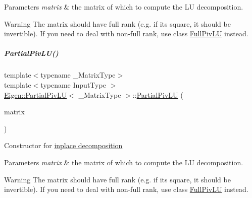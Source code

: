 \begin{DoxyParams}{Parameters}
{\em matrix} & the matrix of which to compute the LU decomposition.\\
\hline
\end{DoxyParams}
\begin{DoxyWarning}{Warning}
The matrix should have full rank (e.\+g. if it\textquotesingle{}s square, it should be invertible). If you need to deal with non-\/full rank, use class \hyperlink{group___l_u___module_class_eigen_1_1_full_piv_l_u}{Full\+Piv\+LU} instead. 
\end{DoxyWarning}
\mbox{\label{group___l_u___module_a8496e71c5cc03948c06aff2fa9e21e40}} 
\subparagraph{\texorpdfstring{Partial\+Piv\+L\+U()}{PartialPivLU()}\hspace{0.1cm}{\footnotesize\ttfamily [8/8]}}
{\footnotesize\ttfamily template$<$typename \+\_\+\+Matrix\+Type$>$ \\
template$<$typename Input\+Type $>$ \\
\hyperlink{group___l_u___module_class_eigen_1_1_partial_piv_l_u}{Eigen\+::\+Partial\+Piv\+LU}$<$ \+\_\+\+Matrix\+Type $>$\+::\hyperlink{group___l_u___module_class_eigen_1_1_partial_piv_l_u}{Partial\+Piv\+LU} (\begin{DoxyParamCaption}\item[{\hyperlink{group___core___module_struct_eigen_1_1_eigen_base}{Eigen\+Base}$<$ Input\+Type $>$ \&}]{matrix }\end{DoxyParamCaption})\hspace{0.3cm}{\ttfamily [explicit]}}

Constructor for \hyperlink{group___inplace_decomposition}{inplace decomposition }


\begin{DoxyParams}{Parameters}
{\em matrix} & the matrix of which to compute the LU decomposition.\\
\hline
\end{DoxyParams}
\begin{DoxyWarning}{Warning}
The matrix should have full rank (e.\+g. if it\textquotesingle{}s square, it should be invertible). If you need to deal with non-\/full rank, use class \hyperlink{group___l_u___module_class_eigen_1_1_full_piv_l_u}{Full\+Piv\+LU} instead. 
\end{DoxyWarning}


